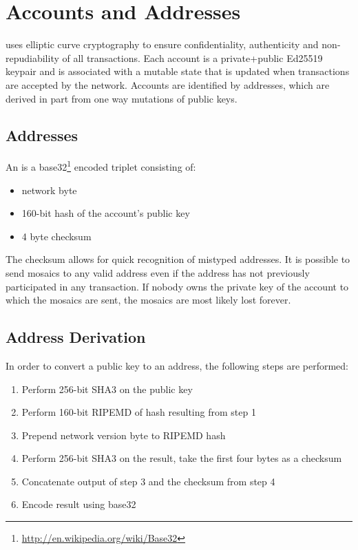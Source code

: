 \section{Accounts and Addresses}
\label{sec:accounts}

\nemquote{
}{}

\codenamechapterfirstword uses elliptic curve cryptography to ensure confidentiality, authenticity and non-repudiability of all transactions.
Each account is a private+public Ed25519 keypair  and is associated with a mutable state that is updated when transactions are accepted by the network.
Accounts are identified by addresses, which are derived in part from one way mutations of public keys.

\subsection{Addresses}

An  is a base32\footnote{ \url{http://en.wikipedia.org/wiki/Base32} } encoded triplet consisting of:
\begin{itemize}
	\item{network byte}
	\item{160-bit hash of the account's public key}
	\item{4 byte checksum}
\end{itemize}

The checksum allows for quick recognition of mistyped addresses.
It is possible to send mosaics to any valid address even if the address has not previously participated in any transaction.
If nobody owns the private key of the account to which the mosaics are sent, the mosaics are most likely lost forever.

\subsection{Address Derivation}
In order to convert a public key to an address, the following steps are performed:
\begin{enumerate}
	\item{Perform 256-bit SHA3 on the public key}
	\item{Perform 160-bit RIPEMD of hash resulting from step 1}
	\item{Prepend network version byte to RIPEMD hash}
	\item{Perform 256-bit SHA3 on the result, take the first four bytes as a checksum}
	\item{Concatenate output of step 3 and the checksum from step 4}
	\item{Encode result using base32}
\end{enumerate}

